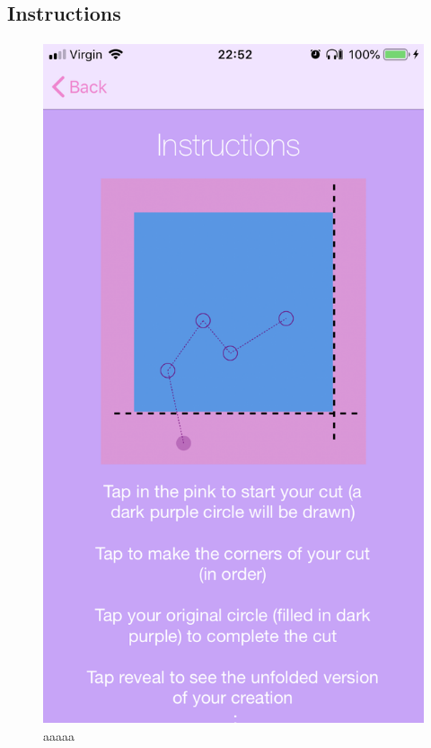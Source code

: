 \documentclass[11pt]{article}
\begin{document}
        \subsection{Instructions}
            
                \paragraph{}
               \begin{figure}[!ht]
                                \begin{minipage}{0.45\textwidth}
                                    \centering \includegraphics[width=0.7\linewidth]{KiriZen/instructionsCreate.png}
                                    \caption{aaaaa}
                                    \label{fig:kiriZen-instructionsCreate}
                                \end{minipage}\hfill
                                \begin{minipage}{0.45\textwidth}
                                    \centering

\end{minipage}
\end{figure}
\end{document}

